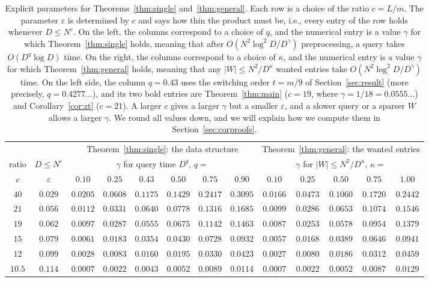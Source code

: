 \begin{table}[t]
\centering
\small
\setlength{\tabcolsep}{3pt}
\begin{tabular}{c|c|cccccc|ccccc}
 & & \multicolumn{6}{c|}{Theorem~\ref{thm:single}: the data structure} & \multicolumn{5}{c}{Theorem~\ref{thm:general}: the wanted entries}\\
ratio & $D\le N^{\varepsilon}$ & \multicolumn{6}{c|}{$\gamma$ for query time $D^{q}$, $q=$} & \multicolumn{5}{c}{$\gamma$ for $|W|\le N^2/D^{\kappa}$, $\kappa=$}\\
$c$ & $\varepsilon$ & $0.10$ & $0.25$ & $0.43$ & $0.50$ & $0.75$ & $0.90$ & $0.10$ & $0.25$ & $0.50$ & $0.75$ & $1.00$\\\hline
$40$ & $0.029$ & $0.0205$ & $0.0608$ & $0.1175$ & $0.1429$ & $0.2417$ & $0.3095$ & $0.0166$ & $0.0473$ & $0.1060$ & $0.1720$ & $0.2442$\\
$21$ & $0.056$ & $0.0112$ & $0.0331$ & $\mathbf{0.0640}$ & $0.0778$ & $0.1316$ & $0.1685$ & $0.0099$ & $0.0286$ & $0.0653$ & $0.1074$ & $0.1546$\\
$19$ & $0.062$ & $0.0097$ & $0.0287$ & $\mathbf{0.0555}$ & $0.0675$ & $0.1142$ & $0.1463$ & $0.0087$ & $0.0253$ & $0.0578$ & $0.0954$ & $0.1379$\\
$15$ & $0.079$ & $0.0061$ & $0.0183$ & $0.0354$ & $0.0430$ & $0.0728$ & $0.0932$ & $0.0057$ & $0.0168$ & $0.0389$ & $0.0646$ & $0.0941$\\
$12$ & $0.099$ & $0.0028$ & $0.0083$ & $0.0160$ & $0.0195$ & $0.0330$ & $0.0423$ & $0.0027$ & $0.0080$ & $0.0186$ & $0.0312$ & $0.0459$\\
$10.5$ & $0.114$ & $0.0007$ & $0.0022$ & $0.0043$ & $0.0052$ & $0.0089$ & $0.0114$ & $0.0007$ & $0.0022$ & $0.0052$ & $0.0087$ & $0.0129$
\end{tabular}
\caption{Explicit parameters for Theorems~\ref{thm:single} and~\ref{thm:general}. Each row is a choice of the ratio $c=L/m$. The parameter $\varepsilon$ is determined by $c$ and says how thin the product must be, i.e., every entry of the row holds whenever $D\le N^{\varepsilon}$. On the left, the columns correspond to a choice of $q$, and the numerical entry is a value $\gamma$ for which Theorem~\ref{thm:single} holds, meaning that after $O(N^2\log^2\!D/D^{\gamma})$ preprocessing, a query takes $O(D^{q}\log D)$ time. On the right, the columns correspond to a choice of $\kappa$, and the numerical entry is a value $\gamma$ for which Theorem~\ref{thm:general} holds, meaning that any $|W|\le N^2/D^{\kappa}$ wanted entries take $O(N^2\log^2\!D/D^{\gamma})$ time. On the left side, the column $q=0.43$ uses the switching order $t=m/9$ of Section~\ref{sec:result} (more precisely, $q=0.4277\ldots$), and its two bold entries are Theorem~\ref{thm:main} ($c=19$, where $\gamma=1/18=0.0555\ldots$) and Corollary~\ref{cor:zt} ($c=21$). A larger $c$ gives a larger $\gamma$ but a smaller $\varepsilon$, and a slower query or a sparser $W$ allows a larger $\gamma$. We round all values down, and we will explain how we compute them in Section~\ref{sec:corproofs}.}
\label{tab:ds}
\end{table}

